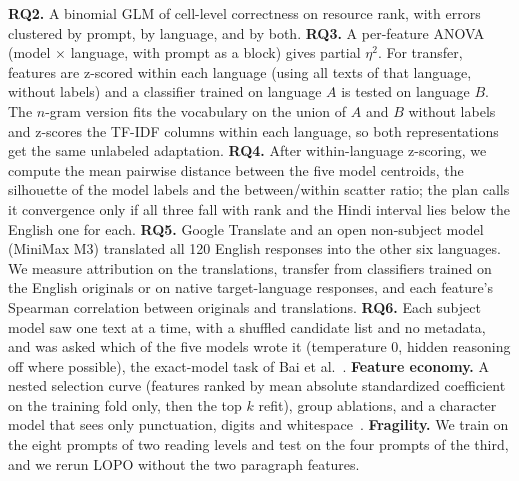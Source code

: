 \documentclass[conference,compsoc]{IEEEtran}
\begin{document}
\textbf{RQ2.} A binomial GLM of cell-level correctness on resource rank, with errors clustered by prompt, by language, and by both. \textbf{RQ3.} A per-feature ANOVA (model $\times$ language, with prompt as a block) gives partial $\eta^2$. For transfer, features are z-scored within each language (using all texts of that language, without labels) and a classifier trained on language $A$ is tested on language $B$. The $n$-gram version fits the vocabulary on the union of $A$ and $B$ without labels and z-scores the TF-IDF columns within each language, so both representations get the same unlabeled adaptation. \textbf{RQ4.} After within-language z-scoring, we compute the mean pairwise distance between the five model centroids, the silhouette of the model labels and the between/within scatter ratio; the plan calls it convergence only if all three fall with rank and the Hindi interval lies below the English one for each. \textbf{RQ5.} Google Translate and an open non-subject model (MiniMax M3) translated all 120 English responses into the other six languages. We measure attribution on the translations, transfer from classifiers trained on the English originals or on native target-language responses, and each feature's Spearman correlation between originals and translations. \textbf{RQ6.} Each subject model saw one text at a time, with a shuffled candidate list and no metadata, and was asked which of the five models wrote it (temperature 0, hidden reasoning off where possible), the exact-model task of Bai et al.~\cite{bai2025selfrecognition}. \textbf{Feature economy.} A nested selection curve (features ranked by mean absolute standardized coefficient on the training fold only, then the top $k$ refit), group ablations, and a character model that sees only punctuation, digits and whitespace~\cite{stamatatos2017distortion}. \textbf{Fragility.} We train on the eight prompts of two reading levels and test on the four prompts of the third, and we rerun LOPO without the two paragraph features.
\end{document}
